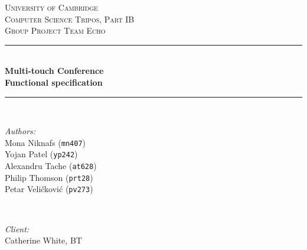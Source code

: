 \documentclass[12p, a4paper, onecolumn]{report}
\begin{document}
\begin{titlepage}

\newcommand{\HRule}{\rule{\linewidth}{0.5mm}} %
\clearpage
\vspace*{\fill}
\center %
 

\textsc{\LARGE University of Cambridge}\\[1.5cm] %
\textsc{\Large Computer Science Tripos, Part IB}\\[0.5cm] %
\textsc{\large Group Project Team Echo}\\[0.5cm] %


\HRule \\[0.4cm]
{ \huge \bfseries Multi-touch Conference}\\[0.4cm]
{ \huge \bfseries Functional specification}\\[0.1cm] %
\HRule \\[1.5cm]
 

\begin{minipage}{0.4\textwidth}
\begin{flushleft} \large
\emph{Authors:}\\
Mona Niknafs (\texttt{mn407})\\
Yojan Patel (\texttt{yp242})\\
Alexandru Tache (\texttt{at628})\\
Philip Thomson (\texttt{prt28})\\
Petar Veli\v{c}kovi\'{c} (\texttt{pv273})\\
\end{flushleft}
\end{minipage}
~
\begin{minipage}{0.4\textwidth}
\begin{flushright} \large
\emph{Client:} \\
Catherine White, BT\\ 
\hfill \\
\hfill \\
\hfill \\
\hfill \\
\end{flushright}
\end{minipage}\\[4cm]


\end{titlepage}
\end{document}
